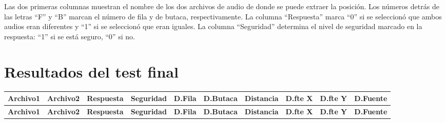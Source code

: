 \documentclass[11pt,a4paper]{book}
\begin{document}
\normalsize		
Las dos primeras columnas muestran el nombre de los dos archivos de audio de donde se puede extraer la posición. Los números detrás de las letras ``F'' y ``B'' marcan el número de fila y de butaca, respectivamente. La columna ``Respuesta'' marca ``0'' si se seleccionó que ambos audios eran diferentes y ``1'' si se seleccionó que eran iguales. La columna ``Seguridad'' determina el nivel de seguridad marcado en la respuesta: ``1'' si se está seguro, ``0'' si no.

\section{Resultados del test final}

\scriptsize
\begin{longtable}[c]{|c|c|c|c|c|c|c|c|c|c|}

		\hline
		\textbf{Archivo1}&\textbf{Archivo2}&\textbf{Respuesta}&\textbf{Seguridad}&\textbf{D.Fila}&\textbf{D.Butaca}&\textbf{Distancia}&\textbf{D.fte X}&\textbf{D.fte Y}&\textbf{D.Fuente}\\ \hline
		\endfirsthead
		\hline
		\textbf{Archivo1}&\textbf{Archivo2}&\textbf{Respuesta}&\textbf{Seguridad}&\textbf{D.Fila}&\textbf{D.Butaca}&\textbf{Distancia}&\textbf{D.fte X}&\textbf{D.fte Y}&\textbf{D.Fuente}\\ \hline
		\endhead
		

\end{longtable}
\end{document}
